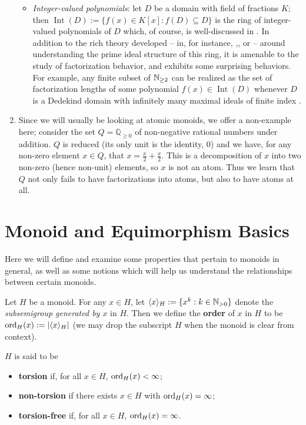 \begin{enumerate}[label={\rm (\roman{*})}]
\begin{itemize}
\item \textit{Integer-valued polynomials}: let $D$ be a domain with field of fractions $K$; then $\operatorname{Int}(D) := \{f(x) \in K[x]: f(D) \subseteq D \}$ is the ring of integer-valued polynomials of $D$ which, of course, is well-discussed in \cite{cahen-chabert97}.
In addition to the rich theory developed -- in, for instance, \cite{loper97a},\cite{loper97b}, or \cite{chapman-loper-smith02} -- around understanding the prime ideal structure of this ring, it is amenable to the study of factorization behavior, and exhibits some surprising behaviors.  
For example, any finite subset of $\mathbb{N}_{\ge2}$ can be realized as the set of factorization lengths of some polynomial $f(x)\in \operatorname{Int}(D)$ whenever $D$ is a Dedekind domain with infinitely many maximal ideals of finite index \cite{frisch-al19,frisch13}.
\end{itemize}
\item Since we will usually be looking at atomic monoids, we offer a non-example here; consider the set $Q = \mathbb{Q}_{\ge 0}$ of non-negative rational numbers under addition.
$Q$ is reduced (its only unit is the identity, $0$) and we have, for any non-zero element $x\in Q$, that $x = \frac{x}{2} + \frac{x}{2}$.
This is a decomposition of $x$ into two non-zero (hence non-unit) elements, so $x$ is not an atom.
Thus we learn that $Q$ not only fails to have factorizations into atoms, but also to have atoms at all.
\end{enumerate}

\section{Monoid and Equimorphism Basics} \label{sec:monoids}
Here we will define and examine some properties that pertain to monoids in general, as well as some notions which will help us understand the relationships between certain monoids.

\begin{defn} \label{def:torsion}
	Let $H$ be a monoid.
	For any $x\in H$, let $\langle x \rangle_H := \{x^k: k\in \mathbb{N}_{>0} \}$ denote the \textit{subsemigroup generated by $x$} in $H$.
	Then we define the \textbf{order} of $x$ in $H$ to be ${\operatorname{ord}}_H(x) := | \langle x \rangle_H|$ (we may drop the subscript $H$ when the monoid is clear from context).
	
	$H$ is said to be
	\begin{itemize}
		\item \textbf{torsion} if, for all $x\in H$, ${\operatorname{ord}}_H(x)<\infty$;
		\item \textbf{non-torsion} if there exists $x\in H$ with ${\operatorname{ord}}_H(x) = \infty$;
		\item \textbf{torsion-free} if, for all $x\in H$, ${\operatorname{ord}}_H(x) = \infty$.
	\end{itemize}
\end{defn}

